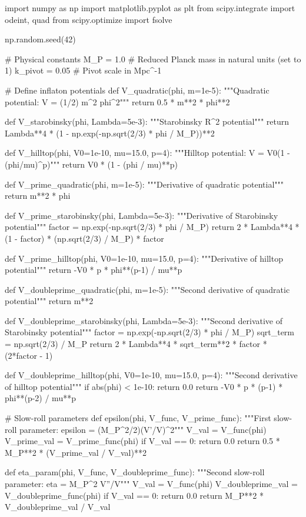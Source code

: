\documentclass[a4paper, 11pt]{article}
\begin{document}
\begin{pycode}
import numpy as np
import matplotlib.pyplot as plt
from scipy.integrate import odeint, quad
from scipy.optimize import fsolve

np.random.seed(42)

# Physical constants
M_P = 1.0  # Reduced Planck mass in natural units (set to 1)
k_pivot = 0.05  # Pivot scale in Mpc^-1

# Define inflaton potentials
def V_quadratic(phi, m=1e-5):
    """Quadratic potential: V = (1/2) m^2 phi^2"""
    return 0.5 * m**2 * phi**2

def V_starobinsky(phi, Lambda=5e-3):
    """Starobinsky R^2 potential"""
    return Lambda**4 * (1 - np.exp(-np.sqrt(2/3) * phi / M_P))**2

def V_hilltop(phi, V0=1e-10, mu=15.0, p=4):
    """Hilltop potential: V = V0(1 - (phi/mu)^p)"""
    return V0 * (1 - (phi / mu)**p)

def V_prime_quadratic(phi, m=1e-5):
    """Derivative of quadratic potential"""
    return m**2 * phi

def V_prime_starobinsky(phi, Lambda=5e-3):
    """Derivative of Starobinsky potential"""
    factor = np.exp(-np.sqrt(2/3) * phi / M_P)
    return 2 * Lambda**4 * (1 - factor) * (np.sqrt(2/3) / M_P) * factor

def V_prime_hilltop(phi, V0=1e-10, mu=15.0, p=4):
    """Derivative of hilltop potential"""
    return -V0 * p * phi**(p-1) / mu**p

def V_doubleprime_quadratic(phi, m=1e-5):
    """Second derivative of quadratic potential"""
    return m**2

def V_doubleprime_starobinsky(phi, Lambda=5e-3):
    """Second derivative of Starobinsky potential"""
    factor = np.exp(-np.sqrt(2/3) * phi / M_P)
    sqrt_term = np.sqrt(2/3) / M_P
    return 2 * Lambda**4 * sqrt_term**2 * factor * (2*factor - 1)

def V_doubleprime_hilltop(phi, V0=1e-10, mu=15.0, p=4):
    """Second derivative of hilltop potential"""
    if abs(phi) < 1e-10:
        return 0.0
    return -V0 * p * (p-1) * phi**(p-2) / mu**p

# Slow-roll parameters
def epsilon(phi, V_func, V_prime_func):
    """First slow-roll parameter: epsilon = (M_P^2/2)(V'/V)^2"""
    V_val = V_func(phi)
    V_prime_val = V_prime_func(phi)
    if V_val == 0:
        return 0.0
    return 0.5 * M_P**2 * (V_prime_val / V_val)**2

def eta_param(phi, V_func, V_doubleprime_func):
    """Second slow-roll parameter: eta = M_P^2 V''/V"""
    V_val = V_func(phi)
    V_doubleprime_val = V_doubleprime_func(phi)
    if V_val == 0:
        return 0.0
    return M_P**2 * V_doubleprime_val / V_val


\end{pycode}
\end{document}
